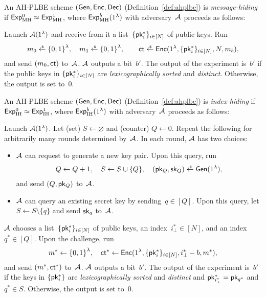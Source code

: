 \begin{definition}\label{def:ahplbe-message-hiding}
An AH-PLBE scheme $({\smash{\mathsf{Gen}}},{\smash{\mathsf{Enc}}},{\smash{\mathsf{Dec}}})$ (Definition~\ref{def:ahplbe})
is \emph{message-hiding} if ${{\smash{\mathsf{Exp}}_{\textup{MH}}^{0}}\approx{\smash{\mathsf{Exp}}_{\textup{MH}}^{1}}}$,
where ${\smash{\mathsf{Exp}}_{\textup{MH}}^{b}}(1^\lambda)$ with adversary~${\mathcal{A}}$ proceeds as follows:
\begin{security}
Launch ${\mathcal{A}}(1^\lambda)$ and
receive from it a list~$\{{\smash{\mathsf{pk}}}_i^\ast\}_{i\in[N]}$ of public keys.
Run
\begin{align*}
m_0\draws\bit^\lambda,\quad
m_1\draws\bit^\lambda,\qquad
\ct\draws\Enc(1^\lambda,\{\pk_i^\ast\}_{i\in[N]},N,m_b),
\end{align*}
and send $(m_0,{\smash{\mathsf{ct}}})$ to~${\mathcal{A}}$.
${\mathcal{A}}$ outputs a bit~$b'$.
The output of the experiment is~$b'$
if the public keys in $\{{\smash{\mathsf{pk}}}_i^\ast\}_{i\in[N]}$ are \emph{lexicographically sorted} and \emph{distinct}.
Otherwise, the output is set to~$0$.
\end{security}
\end{definition}

\begin{definition}\label{def:ahplbe-index-hiding}
An AH-PLBE scheme $({\smash{\mathsf{Gen}}},{\smash{\mathsf{Enc}}},{\smash{\mathsf{Dec}}})$ (Definition~\ref{def:ahplbe})
is \emph{index-hiding} if ${{\smash{\mathsf{Exp}}_{\textup{IH}}^{0}}\approx{\smash{\mathsf{Exp}}_{\textup{IH}}^{1}}}$,
where ${\smash{\mathsf{Exp}}_{\textup{IH}}^{b}}(1^\lambda)$ with adversary~${\mathcal{A}}$ proceeds as follows:
\begin{security}
Launch ${\mathcal{A}}(1^\lambda)$.
Let (set) ${S\gets\varnothing}$ and (counter) ${Q\gets 0}$.
Repeat the following for arbitrarily many rounds determined by~${\mathcal{A}}$.
In each round, ${\mathcal{A}}$ has two choices:
\begin{itemize}
\item ${\mathcal{A}}$ can request to generate a new key pair.
Upon this query, run
\begin{align*}
Q\gets Q+1,\quad
S\gets S\cup\{Q\},\quad
(\pk_Q,\sk_Q)\draws\Gen(1^\lambda),
\end{align*}
and send $(Q,{\smash{\mathsf{pk}}}_Q)$ to~${\mathcal{A}}$.
\item ${\mathcal{A}}$ can query an existing secret key by sending~${q\in[Q]}$.
Upon this query, let
${
S\gets S\setminus\{q\}
}$
and send ${\smash{\mathsf{sk}}}_q$ to~${\mathcal{A}}$.
\end{itemize}
${\mathcal{A}}$ chooses
a list~$\{{\smash{\mathsf{pk}}}_i^\ast\}_{i\in[N]}$ of public keys,
an index~${i_\bot^\ast\in[N]}$, and
an index~${q^\ast\in[Q]}$.
Upon the challenge, run
\begin{align*}
m^\ast\gets\bit^\lambda,\quad
\ct^\ast\gets\Enc(1^\lambda,\{\pk_i^\ast\}_{i\in[N]},i_\bot^\ast-b,m^\ast),
\end{align*}
and send $(m^\ast,{\smash{\mathsf{ct}}}^\ast)$ to~${\mathcal{A}}$.
${\mathcal{A}}$ outputs a bit~$b'$.
The output of the experiment is~$b'$ if
the keys in $\{{\smash{\mathsf{pk}}}_i^\ast\}$ are \emph{lexicographically sorted} and \emph{distinct} and
${\pk_{i_\bot^\ast}^\ast=\pk_{q^\ast}}$ and ${q^\ast\in S}$.
Otherwise, the output is set to~$0$.
\end{security}
\end{definition}
